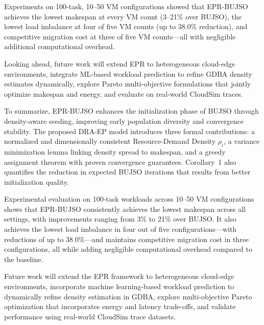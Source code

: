 \documentclass[journal]{IEEEtran}
\begin{document}
Experiments on 100-task, 10--50 VM configurations showed that EPR-BUJSO achieves the lowest makespan at every VM count (3--21\% over BUJSO), the lowest load imbalance at four of five VM counts (up to 38.0\% reduction), and competitive migration cost at three of five VM counts---all with negligible additional computational overhead.

Looking ahead, future work will extend EPR to heterogeneous cloud-edge environments, integrate ML-based workload prediction to refine GDBA density estimates dynamically, explore Pareto multi-objective formulations that jointly optimize makespan and energy, and evaluate on real-world CloudSim traces.

To summarize, EPR-BUJSO enhances the initialization phase of BUJSO through density-aware seeding, improving early population diversity and convergence stability. The proposed DRA-EP model introduces three formal contributions: a normalized and dimensionally consistent Resource-Demand Density $\rho_i$, a variance minimization lemma linking density spread to makespan, and a greedy assignment theorem with proven convergence guarantees. Corollary~1 also quantifies the reduction in expected BUJSO iterations that results from better initialization quality.

Experimental evaluation on 100-task workloads across 10--50 VM configurations shows that EPR-BUJSO consistently achieves the lowest makespan across all settings, with improvements ranging from 3\% to 21\% over BUJSO. It also achieves the lowest load imbalance in four out of five configurations---with reductions of up to 38.0\%---and maintains competitive migration cost in three configurations, all while adding negligible computational overhead compared to the baseline.

Future work will extend the EPR framework to heterogeneous cloud-edge environments, incorporate machine learning-based workload prediction to dynamically refine density estimation in GDBA, explore multi-objective Pareto optimization that incorporates energy and latency trade-offs, and validate performance using real-world CloudSim trace datasets.
\end{document}
